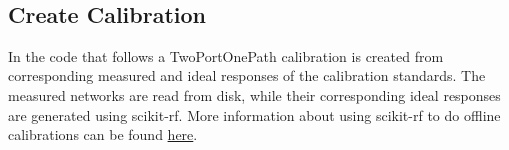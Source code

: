 \documentclass{article}
\begin{document}
    \begin{center}
    \end{center}
    { \hspace*{\fill} \\}
    

    \subsection{Create Calibration}


    In the code that follows a TwoPortOnePath calibration is created from
corresponding measured and ideal responses of the calibration standards.
The measured networks are read from disk, while their corresponding
ideal responses are generated using scikit-rf. More information about
using scikit-rf to do offline calibrations can be found
\href{http://scikit-rf.readthedocs.org/en/latest/tutorials/calibration.html}{here}.
\end{document}
